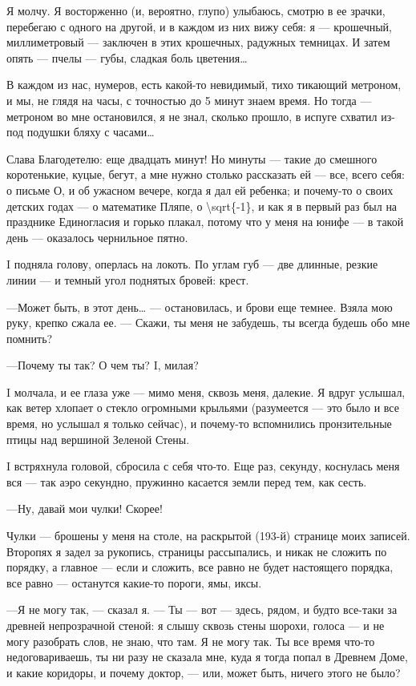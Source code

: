 \documentclass[11pt,openany]{book}
\begin{document}
Я молчу. Я восторженно (и, вероятно, глупо) улыбаюсь, смотрю в ее зрачки, перебегаю с одного на другой, и в каждом из них вижу себя: я --- крошечный, миллиметровый --- заключен в этих крошечных, радужных темницах. И затем опять --- пчелы --- губы, сладкая боль цветения\ldots{}

В каждом из нас, нумеров, есть какой-то невидимый, тихо тикающий метроном, и мы, не глядя на часы, с точностью до 5 минут знаем время. Но тогда --- метроном во мне остановился, я не знал, сколько прошло, в испуге схватил из-под подушки бляху с часами\ldots{}

Слава Благодетелю: еще двадцать минут! Но минуты --- такие до смешного коротенькие, куцые, бегут, а мне нужно столько рассказать ей --- все, всего себя: о письме О, и об ужасном вечере, когда я дал ей ребенка; и почему-то о своих детских годах --- о математике Пляпе, о \textbackslash{}sqrt\{-1\}, и как я в первый раз был на празднике Единогласия и горько плакал, потому что у меня на юнифе --- в такой день --- оказалось чернильное пятно.

I подняла голову, оперлась на локоть. По углам губ --- две длинные, резкие линии --- и темный угол поднятых бровей: крест.

---Может быть, в этот день\ldots{} --- остановилась, и брови еще темнее. Взяла мою руку, крепко сжала ее. --- Скажи, ты меня не забудешь, ты всегда будешь обо мне помнить?

---Почему ты так? О чем ты? I, милая?

I молчала, и ее глаза уже --- мимо меня, сквозь меня, далекие. Я вдруг услышал, как ветер хлопает о стекло огромными крыльями (разумеется --- это было и все время, но услышал я только сейчас), и почему-то вспомнились пронзительные птицы над вершиной Зеленой Стены.

I встряхнула головой, сбросила с себя что-то. Еще раз, секунду, коснулась меня вся --- так аэро секундно, пружинно касается земли перед тем, как сесть.

---Ну, давай мои чулки! Скорее!

Чулки --- брошены у меня на столе, на раскрытой (193-й) странице моих записей. Второпях я задел за рукопись, страницы рассыпались, и никак не сложить по порядку, а главное --- если и сложить, все равно не будет настоящего порядка, все равно --- останутся какие-то пороги, ямы, иксы.

---Я не могу так, --- сказал я. --- Ты --- вот --- здесь, рядом, и будто все-таки за древней непрозрачной стеной: я слышу сквозь стены шорохи, голоса --- и не могу разобрать слов, не знаю, что там. Я не могу так. Ты все время что-то недоговариваешь, ты ни разу не сказала мне, куда я тогда попал в Древнем Доме, и какие коридоры, и почему доктор, --- или, может быть, ничего этого не было?
\end{document}
